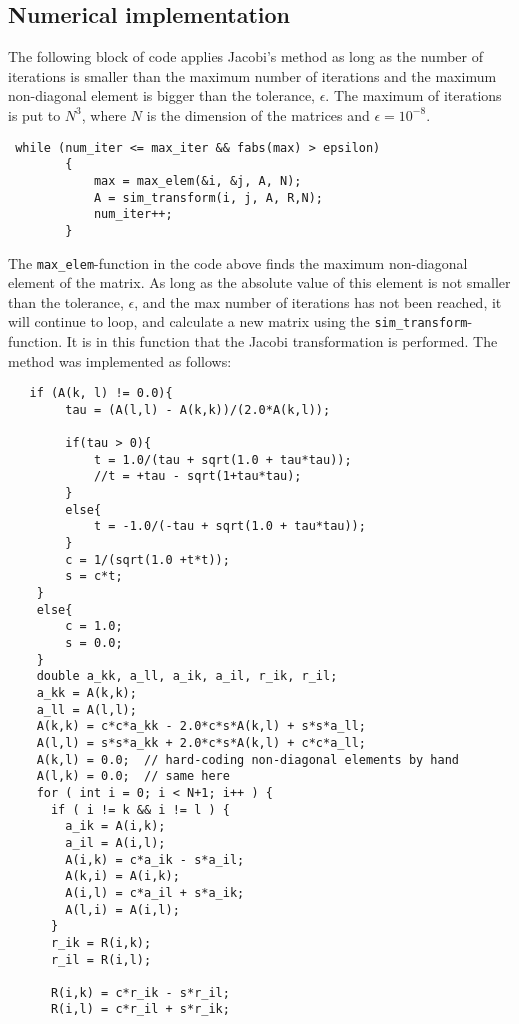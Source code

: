 \documentclass[12pt]{article}
\begin{document}
\subsection{Numerical implementation}


The following block of code applies Jacobi's method as long as the number of iterations is smaller than the maximum number of iterations and the maximum non-diagonal element is bigger than the tolerance, $\epsilon$. The maximum of iterations is put to $N^3$, where $N$ is the dimension of the matrices and $\epsilon = 10^{-8}$. 

\begin{lstlisting}
 while (num_iter <= max_iter && fabs(max) > epsilon)
        {
            max = max_elem(&i, &j, A, N);
            A = sim_transform(i, j, A, R,N);
            num_iter++;
        }
\end{lstlisting}
The \lstinline{max_elem}-function in the code above finds the maximum non-diagonal element of the matrix. As long as the absolute value of this element is not smaller than the tolerance, $\epsilon$, and the max number of iterations has not been reached, it will continue to loop, and calculate a new matrix using the \lstinline{sim_transform}-function. It is in this function that the Jacobi transformation is performed. The method was implemented as follows:
\newline
\begin{lstlisting}
   if (A(k, l) != 0.0){
        tau = (A(l,l) - A(k,k))/(2.0*A(k,l));

        if(tau > 0){
            t = 1.0/(tau + sqrt(1.0 + tau*tau));
            //t = +tau - sqrt(1+tau*tau);
        }
        else{
            t = -1.0/(-tau + sqrt(1.0 + tau*tau));
        }
        c = 1/(sqrt(1.0 +t*t));
        s = c*t;
    }
    else{
        c = 1.0;
        s = 0.0;
    }
    double a_kk, a_ll, a_ik, a_il, r_ik, r_il;
    a_kk = A(k,k);
    a_ll = A(l,l);
    A(k,k) = c*c*a_kk - 2.0*c*s*A(k,l) + s*s*a_ll;
    A(l,l) = s*s*a_kk + 2.0*c*s*A(k,l) + c*c*a_ll;
    A(k,l) = 0.0;  // hard-coding non-diagonal elements by hand
    A(l,k) = 0.0;  // same here
    for ( int i = 0; i < N+1; i++ ) {
      if ( i != k && i != l ) {
        a_ik = A(i,k);
        a_il = A(i,l);
        A(i,k) = c*a_ik - s*a_il;
        A(k,i) = A(i,k);
        A(i,l) = c*a_il + s*a_ik;
        A(l,i) = A(i,l);
      }
      r_ik = R(i,k);
      r_il = R(i,l);

      R(i,k) = c*r_ik - s*r_il;
      R(i,l) = c*r_il + s*r_ik;
\end{lstlisting}
\end{document}
